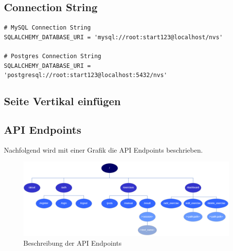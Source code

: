 \subsection{Connection String}
\begin{lstlisting}[caption={Database Connection String}]
# MySQL Connection String
SQLALCHEMY_DATABASE_URI = 'mysql://root:start123@localhost/nvs'

# Postgres Connection String
SQLALCHEMY_DATABASE_URI = 'postgresql://root:start123@localhost:5432/nvs'
\end{lstlisting}



\subsection{Seite Vertikal einfügen}

\begin{landscape}
\subsection{API Endpoints}
Nachfolgend wird mit einer Grafik die API Endpoints beschrieben.
\begin{center}
\begin{figure}[H]
	\includegraphics[width=1.5\textwidth]{images/RestAPI.png}
	\caption{Beschreibung der API Endpoints}
\end{figure}
\end{center}
\end{landscape}

